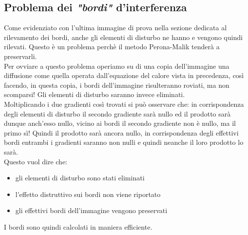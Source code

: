 \newpage 
\subsection{Problema dei \textit{"bordi"} d'interferenza}
Come evidenziato con l'ultima immagine di prova nella sezione dedicata al rilevamento dei bordi, anche gli elementi di disturbo ne hanno e vengono quindi rilevati. Questo è un problema perchè il metodo Perona-Malik tenderà a preservarli.\\
Per ovviare a questo problema operiamo su di una copia dell'immagine una diffusione come quella operata dall'equazione del calore vista in precedenza, così facendo, in questa copia, i bordi dell'immagine risulteranno roviati, ma non scomparsi! Gli elementi di disturbo saranno invece eliminati.\\
Moltiplicando i due gradienti così trovati si può osservare che: in corrispondenza degli elementi di disturbo il secondo gradiente sarà nullo ed il prodotto sarà dunque anch'esso nullo, vicino ai bordi il secondo gradiente non è nullo, ma il primo sì! Quindi il prodotto sarà ancora nullo, in corrispondenza degli effettivi bordi entrambi i gradienti saranno non nulli e quindi neanche il loro prodotto lo sarà.\\ Questo vuol dire che:\\
\begin{itemize}
    \item gli elementi di disturbo sono stati eliminati
    \item l'effetto distruttivo sui bordi non viene riportato
    \item gli effettivi bordi dell'immagine vengono preservati
\end{itemize}
I bordi sono quindi calcolati in maniera efficiente.\\
\vspace{1em}
